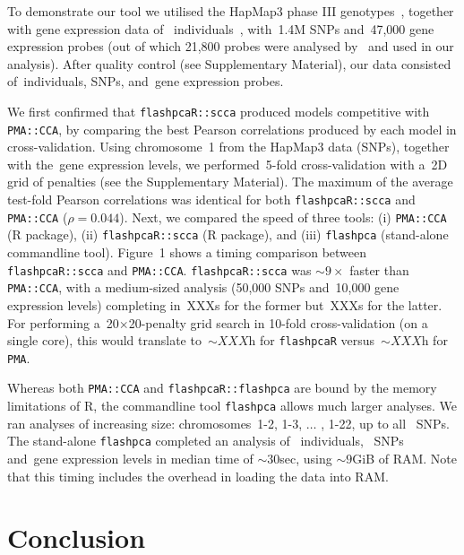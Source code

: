 \documentclass{bioinfo}
\begin{document}
To demonstrate our tool we utilised the HapMap3 phase III
genotypes~\citep{hapmap2010}, together with gene expression data of~\nindiv
individuals~\citep{Stranger2012}, with~1.4M SNPs and~47,000 gene expression
probes (out of which 21,800 probes were analysed by~\citet{Stranger2012} and
used in our analysis). After quality control (see Supplementary Material),
our data consisted of~\nindiv individuals, \nsnps SNPs, and~\ngenes gene
expression probes.

We first confirmed that \texttt{flashpcaR::scca} produced models competitive
with \texttt{PMA::CCA}, by comparing the best Pearson correlations
produced by each model in cross-validation.  Using chromosome~1 from the
HapMap3 data (\nsnpschr SNPs), together with the~\ngenes gene expression
levels, we performed~5-fold cross-validation with a~2D grid of penalties
(see the Supplementary Material). The maximum of the average test-fold
Pearson correlations was identical for both \texttt{flashpcaR::scca}
and \texttt{PMA::CCA} ($\rho{=}0.044$).  Next, we compared the speed
of three tools: (i) \texttt{PMA::CCA} (\textsf{R} package), (ii)
\texttt{flashpcaR::scca} (\textsf{R} package), and (iii) \texttt{flashpca}
(stand-alone commandline tool).  Figure~1\vphantom{\ref{fig:01}} shows a
timing comparison between \texttt{flashpcaR::scca} and \texttt{PMA::CCA}.
\texttt{flashpcaR::scca} was ${\sim}9\times$ faster than \texttt{PMA::CCA},
with a medium-sized analysis (50,000 SNPs and~10,000 gene expression levels)
completing in~XXXs for the former but~XXXs for the latter.  For performing
a~20${\times}$20-penalty grid search in 10-fold cross-validation (on a
single core), this would translate to~${\sim}XXX$h for \texttt{flashpcaR}
versus~${\sim}XXX$h for \texttt{PMA}.

Whereas both \texttt{PMA::CCA} and \texttt{flashpcaR::flashpca}
are bound by the memory limitations of \textsf{R}, the commandline
tool \texttt{flashpca} allows much larger analyses. We ran analyses of
increasing size: chromosomes~1-2, 1-3, $\hdots$ , 1-22, up to all~\nsnps
SNPs. The stand-alone \texttt{flashpca} completed an analysis of~\nindiv
individuals, ~\nsnps SNPs and~\ngenes gene expression levels in median time
of ${\sim}30$sec, using ${\sim}9$GiB of RAM. Note that this timing includes
the overhead in loading the data into RAM.\vspace*{-12pt}

\section{Conclusion}
\end{document}
